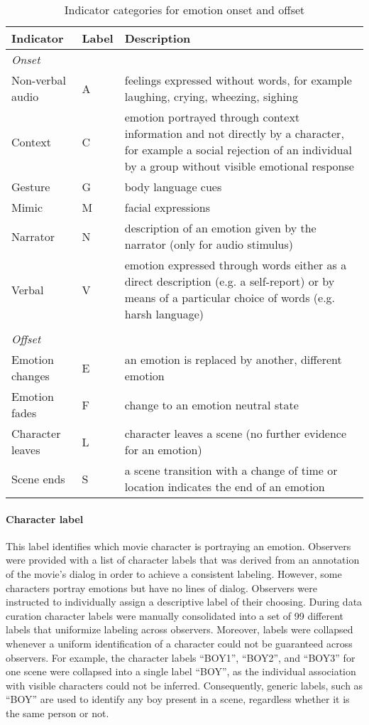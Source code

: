 \begin{table}
  \centering
  \begin{tabular}{llp{8cm}}
    Indicator & Label & Description \\
    \hline
    \textit{Onset}\\
    Non-verbal audio & A & feelings expressed without words, for example laughing, crying, wheezing, sighing\\
    Context & C & emotion portrayed through context information and not directly by a character, for example a social rejection of an individual by a group without visible emotional response\\
    Gesture & G & body language cues \\
    Mimic & M & facial expressions \\
    Narrator & N & description of an emotion given by the narrator (only for audio stimulus)\\
    Verbal & V & emotion expressed through words either as a direct description (e.g. a self-report) or by means of a particular choice of words (e.g. harsh language)\\
    \\
    \textit{Offset}\\
    Emotion changes & E & an emotion is replaced by another, different emotion \\
    Emotion fades & F & change to an emotion neutral state \\
    Character leaves & L & character leaves a scene (no further evidence for an emotion)\\
    Scene ends & S & a scene transition with a change of time or location indicates the end of an emotion\\

  \end{tabular}
  \caption{Indicator categories for emotion onset and offset}
  \label{tab:onoffset_indicators}
\end{table}

\paragraph{Character label}

This label identifies which movie character is portraying an emotion. Observers
were provided with a list of character labels that was derived from an
annotation of the movie's dialog in order to achieve a consistent labeling.
However, some characters portray emotions but have no lines of dialog.
Observers were instructed to individually assign a descriptive label of their
choosing. During data curation character labels were manually consolidated
into a set of 99 different labels that uniformize labeling across observers.
Moreover, labels were collapsed whenever a uniform identification of a
character could not be guaranteed across observers. For example, the character
labels ``BOY1'', ``BOY2'', and ``BOY3'' for one scene were collapsed into a
single label ``BOY'', as the individual association with visible characters
could not be inferred. Consequently, generic labels, such as ``BOY'' are used
to identify any boy present in a scene, regardless whether it is the same
person or not.


